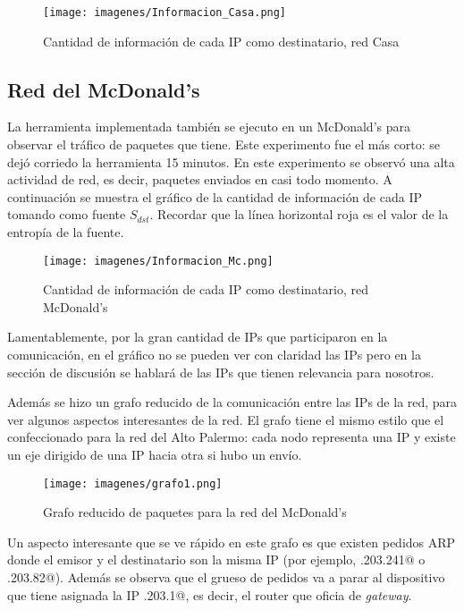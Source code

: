\begin{figure}[htb]
\begin{center}
\texttt{[image: imagenes/Informacion\_Casa.png]}
\caption{Cantidad de informaci\'on de cada IP como destinatario, red Casa}
\end{center}
\end{figure}

\subsection{Red del McDonald's}

La herramienta implementada tambi\'en se ejecuto en un McDonald's para observar el tr\'afico de 
paquetes que tiene. Este experimento fue el m\'as corto: se dej\'o corriedo la herramienta 15 minutos.
En este experimento se observ\'o una alta actividad de red, es decir, paquetes enviados en casi
todo momento. A continuaci\'on se muestra el gr\'afico de la cantidad de informaci\'on de cada IP
tomando como fuente $S_{dst}$. Recordar que la l\'inea horizontal roja es el valor de la entrop\'ia 
de la fuente.

\begin{figure}[htb]
\begin{center}
\texttt{[image: imagenes/Informacion\_Mc.png]}
\caption{Cantidad de informaci\'on de cada IP como destinatario, red McDonald's}
\end{center}
\end{figure}

Lamentablemente, por la gran cantidad de IPs que participaron en la comunicaci\'on, en el gr\'afico
no se pueden ver con claridad las IPs pero en la secci\'on de discusi\'on se hablar\'a de las IPs
que tienen relevancia para nosotros.

Adem\'as se hizo un grafo reducido de la comunicaci\'on entre las IPs de la red, para ver algunos
aspectos interesantes de la red. El grafo tiene el mismo estilo que el confeccionado para la red 
del Alto Palermo: cada nodo representa una IP y existe un eje dirigido de una IP hacia otra si hubo
un env\'io.

\begin{figure}[htb]
\begin{center}
\texttt{[image: imagenes/grafo1.png]}
\caption{Grafo reducido de paquetes para la red del McDonald's}
\end{center}
\end{figure}

Un aspecto interesante que se ve r\'apido en este grafo es que existen pedidos ARP donde el emisor
y el destinatario son la misma IP (por ejemplo, .203.241@ o .203.82@). 
Adem\'as se observa que el grueso de pedidos va a parar al dispositivo que tiene asignada la IP
.203.1@, es decir, el router que oficia de \emph{gateway}.


